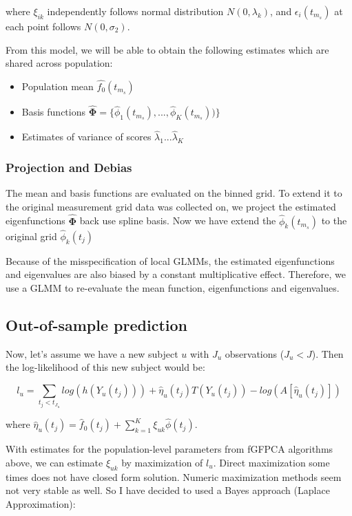 \documentclass[
]{article}
\providecommand{\tightlist}{%
  \setlength{\itemsep}{0pt}\setlength{\parskip}{0pt}}
\begin{document}
where \(\xi_{ik}\) independently follows normal distribution
\(N(0, \lambda_k)\), and \(\epsilon_i(t_{m_s})\) at each point follows
\(N(0, \sigma_2)\).

From this model, we will be able to obtain the following estimates which
are shared across population:

\begin{itemize}
\tightlist
\item
  Population mean \(\hat{f_0}(t_{m_s})\)
\item
  Basis functions
  \(\hat{\mathbf{\Phi}} = \{\hat{\phi}_1(t_{m_s}), ...,\hat{\phi}_K(t_{m_s}))\}\)
\item
  Estimates of variance of scores \(\hat{\lambda}_1...\hat{\lambda}_K\)
\end{itemize}

\hypertarget{projection-and-debias}{%
\subsubsection{Projection and Debias}\label{projection-and-debias}}

The mean and basis functions are evaluated on the binned grid. To extend
it to the original measurement grid data was collected on, we project
the estimated eigenfunctions \(\hat{\mathbf{\Phi}}\) back use spline
basis. Now we have extend the \(\hat{\phi}_k(t_{m_s})\) to the original
grid \(\hat{\phi}_k(t_j)\)

Because of the misspecification of local GLMMs, the estimated
eigenfunctions and eigenvalues are also biased by a constant
multiplicative effect. Therefore, we use a GLMM to re-evaluate the mean
function, eigenfunctions and eigenvalues.

\hypertarget{out-of-sample-prediction}{%
\subsection{Out-of-sample prediction}\label{out-of-sample-prediction}}

Now, let's assume we have a new subject \(u\) with \(J_u\) observations
(\(J_u < J\)). Then the log-likelihood of this new subject would be:

\[l_u=\sum_{t_j<t_{J_u}}log(h(Y_u(t_j)))+\hat{\eta}_u(t_j)T(Y_u(t_j))-log(A[\hat{\eta}_u(t_j)])\]

where
\(\hat{\eta}_u(t_j) = \hat{f}_0(t_j)+\sum_{k=1}^K \xi_{uk}\hat{\phi}(t_j)\).

With estimates for the population-level parameters from fGFPCA
algorithms above, we can estimate \(\xi_{uk}\) by maximization of
\(l_u\). Direct maximization some times does not have closed form
solution. Numeric maximization methods seem not very stable as well. So
I have decided to used a Bayes approach (Laplace Approximation):
\end{document}
